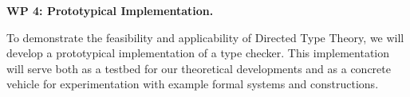 \documentclass[a4paper,11pt]{article}
\renewcommand{\paragraph}[1]{\textbf{#1.}}
\begin{document}








\paragraph{WP 4: Prototypical Implementation}

To demonstrate the feasibility and applicability of Directed Type
Theory, we will develop a prototypical implementation of a type
checker. This implementation will serve both as a testbed for our
theoretical developments and as a concrete vehicle for experimentation
with example formal systems and constructions.
\end{document}
